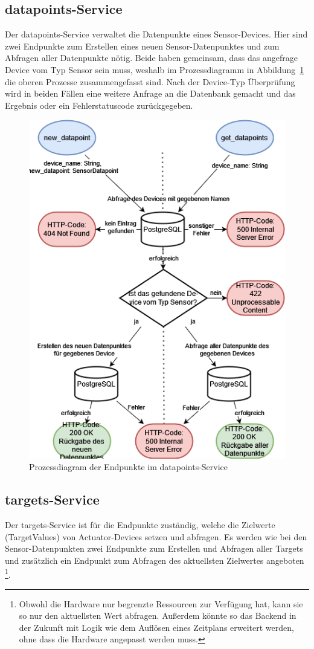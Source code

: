     \subsection{datapoints-Service}
        Der datapoints-Service verwaltet die Datenpunkte eines Sensor-Devices.
        Hier sind zwei Endpunkte zum Erstellen eines neuen Sensor-Datenpunktes und zum Abfragen aller Datenpunkte nötig.
        Beide haben gemeinsam, dass das angefrage Device vom Typ Sensor sein muss, weshalb im Prozessdiagramm in Abbildung~\ref{fig:backend-service-datapoints} die oberen Prozesse zusammengefasst sind.
        Nach der Device-Typ Überprüfung wird in beiden Fällen eine weitere Anfrage an die Datenbank gemacht und das Ergebnis oder ein Fehlerstatuscode zurückgegeben.
        \begin{figure}[H]
            \includegraphics[width=0.7\linewidth]{images/prozessdiagramm_backend_datapoints.drawio.png}
            \centering
            \caption{Prozessdiagram der Endpunkte im datapoints-Service}
            \label{fig:backend-service-datapoints}
        \end{figure}

    \subsection{targets-Service}
        Der targets-Service ist für die Endpunkte zuständig, welche die Zielwerte (TargetValues) von Actuator-Devices setzen und abfragen.
        Es werden wie bei den Sensor-Datenpunkten zwei Endpunkte zum Erstellen und Abfragen aller Targets und zusätzlich ein Endpunkt zum Abfragen des aktuellsten Zielwertes angeboten
        \footnote{ Obwohl die Hardware nur begrenzte Ressourcen zur Verfügung hat, kann sie so nur den aktuellsten Wert abfragen. Außerdem könnte so das Backend in der Zukunft mit Logik wie dem Auflösen eines Zeitplans erweitert werden, ohne dass die Hardware angepasst werden muss. }.


